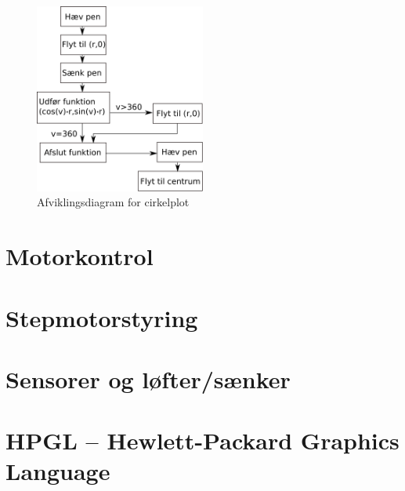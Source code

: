 \begin{figure}[htbp]
  \centering
  \includegraphics[width=0.5\textwidth]{./img/afviklingsdiagram-cirkel}
  \caption{Afviklingsdiagram for cirkelplot}
  \label{fig:hpgl-cirkel-afvikling}
\end{figure}


\section[Motorkontrol (med buffer)]{Motorkontrol}



\section{Stepmotorstyring}



\section{Sensorer og løfter/sænker}


\section{HPGL -- Hewlett-Packard Graphics Language}



